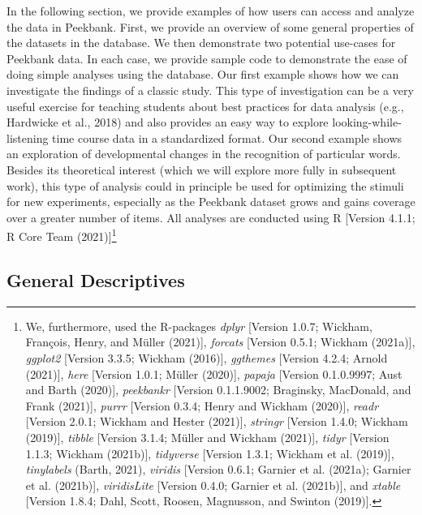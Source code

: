 \documentclass[
  english,
  man,floatsintext]{apa6}
\begin{document}
In the following section, we provide examples of how users can access and analyze the data in Peekbank.
First, we provide an overview of some general properties of the datasets in the database.
We then demonstrate two potential use-cases for Peekbank data.
In each case, we provide sample code to demonstrate the ease of doing simple analyses using the database.
Our first example shows how we can investigate the findings of a classic study.
This type of investigation can be a very useful exercise for teaching students about best practices for data analysis (e.g., Hardwicke et al., 2018) and also provides an easy way to explore looking-while-listening time course data in a standardized format.
Our second example shows an exploration of developmental changes in the recognition of particular words.
Besides its theoretical interest (which we will explore more fully in subsequent work), this type of analysis could in principle be used for optimizing the stimuli for new experiments, especially as the Peekbank dataset grows and gains coverage over a greater number of items.
All analyses are conducted using R {[}Version 4.1.1; R Core Team (2021){]}\footnote{We, furthermore, used the R-packages \emph{dplyr} {[}Version 1.0.7; Wickham, François, Henry, and Müller (2021){]}, \emph{forcats} {[}Version 0.5.1; Wickham (2021a){]}, \emph{ggplot2} {[}Version 3.3.5; Wickham (2016){]}, \emph{ggthemes} {[}Version 4.2.4; Arnold (2021){]}, \emph{here} {[}Version 1.0.1; Müller (2020){]}, \emph{papaja} {[}Version 0.1.0.9997; Aust and Barth (2020){]}, \emph{peekbankr} {[}Version 0.1.1.9002; Braginsky, MacDonald, and Frank (2021){]}, \emph{purrr} {[}Version 0.3.4; Henry and Wickham (2020){]}, \emph{readr} {[}Version 2.0.1; Wickham and Hester (2021){]}, \emph{stringr} {[}Version 1.4.0; Wickham (2019){]}, \emph{tibble} {[}Version 3.1.4; Müller and Wickham (2021){]}, \emph{tidyr} {[}Version 1.1.3; Wickham (2021b){]}, \emph{tidyverse} {[}Version 1.3.1; Wickham et al. (2019){]}, \emph{tinylabels} (Barth, 2021), \emph{viridis} {[}Version 0.6.1; Garnier et al. (2021a); Garnier et al. (2021b){]}, \emph{viridisLite} {[}Version 0.4.0; Garnier et al. (2021b){]}, and \emph{xtable} {[}Version 1.8.4; Dahl, Scott, Roosen, Magnusson, and Swinton (2019){]}.}

\hypertarget{general-descriptives}{%
\subsection{General Descriptives}\label{general-descriptives}}
\end{document}
